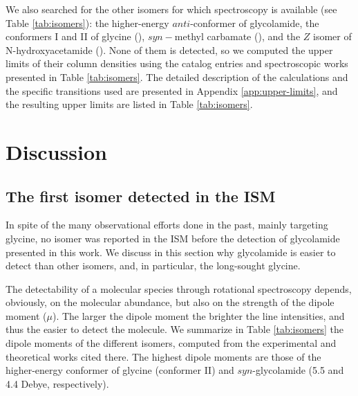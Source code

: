 \documentclass[twocolumn]{aastex63}
\begin{document}
We also searched for the other  isomers for which spectroscopy is available (see Table \ref{tab:isomers}): the higher-energy $anti$-conformer of glycolamide, the conformers I and II of glycine (), $syn-$methyl carbamate (), and the $Z$ isomer of N-hydroxyacetamide (). None of them is detected, so we computed the upper limits of their column densities using the catalog entries and spectroscopic works presented in Table \ref{tab:isomers}. The detailed description of the calculations and the specific transitions used are presented in Appendix \ref{app:upper-limits}, and the resulting upper limits are listed in Table \ref{tab:isomers}.

\section{Discussion}
\label{sec:discussion}

\subsection{The first  isomer detected in the ISM}

In spite of the many observational efforts done in the past, mainly targeting glycine, no  isomer was reported in the ISM before the detection of glycolamide presented in this work. We discuss in this section why glycolamide is easier to detect than other isomers, and, in particular, the long-sought glycine.

The detectability of a molecular species through rotational spectroscopy depends, obviously, on the molecular abundance, but also on the strength of the dipole moment ($\mu$). The larger the dipole moment the brighter the line intensities, and thus the easier to detect the molecule. We summarize in Table \ref{tab:isomers} the dipole moments of the different  isomers, computed from the experimental and theoretical works cited there. The highest dipole moments are those of the higher-energy conformer of glycine (conformer II) and $syn$-glycolamide (5.5 and 4.4 Debye, respectively). 
\end{document}
